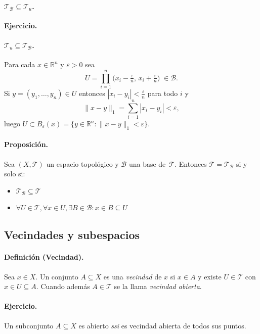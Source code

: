 \paragraph{\textbf{$\mathcal T_{\mathcal{B}}\subseteq\mathcal T_{u}$.}}

\textbf{Ejercicio.}

\paragraph{\textbf{$\mathcal T_{u}\subseteq\mathcal T_{\mathcal{B}}$.}}
Para cada $x\in\mathbb{R}^{n}$ y $\varepsilon>0$ sea
\[
  U=\prod_{i=1}^{n}\!\bigl(x_{i}-\tfrac{\varepsilon}{n},\,x_{i}+\tfrac{\varepsilon}{n}\bigr)
  \;\in\mathcal{B}.
\]
Si $y=(y_{1},\dots,y_{n})\in U$ entonces $|x_{i}-y_{i}|<\tfrac{\varepsilon}{n}$
para todo $i$ y
\[
  \|x-y\|_{1}
  =\sum_{i=1}^{n}|x_{i}-y_{i}|<\varepsilon,
\]
luego $U\subset B_{\varepsilon}(x) = \{y\in\mathbb{R}^{n}:\|x-y\|_{1}<\varepsilon\}$.

\paragraph{\textbf{Proposición.}}
Sea $(X,\mathcal T)$ un espacio topológico y $\mathcal{B}$ una base de $\mathcal T$. Entonces $\mathcal T=\mathcal T_{\mathcal{B}}$ si y solo si:

\begin{itemize}
  \item $\mathcal T_\mathcal{B} \subseteq \mathcal T$
  \item $\forall U \in \mathcal T,\forall x \in U, \exists B \in \mathcal B:  x \in B \subseteq U$ 
\end{itemize}

\subsection{Vecindades y subespacios}

\paragraph{\textbf{Definición (Vecindad).}}
Sea $x\in X$. Un conjunto $A\subseteq X$ es una \emph{vecindad} de $x$
si $x\in A$ y existe $U\in\mathcal T$ con $x\in U\subseteq A$. Cuando además
$A\in\mathcal T$ se la llama \emph{vecindad abierta}.

\paragraph{\textbf{Ejercicio.}}
Un subconjunto $A\subseteq X$ es abierto \emph{ssi} es vecindad abierta de todos sus puntos.

